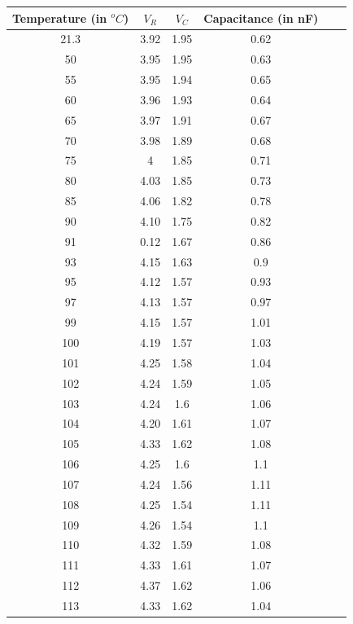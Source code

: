 \documentclass[a4paper]{article}
\begin{document}
\begin{table}[htb]
    \centering
    \begin{tabular}{@{}cccccc@{}}
        \toprule
        Temperature (in $^oC$) & $V_R$ & $V_C$ & Capacitance (in nF) &  &  \\
        \midrule
        21.3 & 3.92 & 1.95 & 0.62 &  &  \\
        50 & 3.95 & 1.95 & 0.63 &  &  \\
        55 & 3.95 & 1.94 & 0.65 &  &  \\
        60 & 3.96 & 1.93 & 0.64 &  &  \\
        65 & 3.97 & 1.91 & 0.67 &  &  \\
        70 & 3.98 & 1.89 & 0.68 &  &  \\
        75 & 4 & 1.85 & 0.71 &  &  \\
        80 & 4.03 & 1.85 & 0.73 &  &  \\
        85 & 4.06 & 1.82 & 0.78 &  &  \\
        90 & 4.10 & 1.75 & 0.82 &  &  \\
        91 & 0.12 & 1.67 & 0.86 &  &  \\
        93 & 4.15 & 1.63 & 0.9 &  &  \\
        95 & 4.12 & 1.57 & 0.93 &  &  \\
        97 & 4.13 & 1.57 & 0.97 &  &  \\
        99 & 4.15 & 1.57 & 1.01 &  &  \\
        100 & 4.19 & 1.57 & 1.03 &  &  \\
        101 & 4.25 & 1.58 & 1.04 &  &  \\
        102 & 4.24 & 1.59 & 1.05 &  &  \\
        103 & 4.24 & 1.6 & 1.06 &  &  \\
        104 & 4.20 & 1.61 & 1.07 &  &  \\
        105 & 4.33 & 1.62 & 1.08 &  &  \\
        106 & 4.25 & 1.6 & 1.1 &  &  \\
        107 & 4.24 & 1.56 & 1.11 &  &  \\
        108 & 4.25 & 1.54 & 1.11 &  &  \\
        109 & 4.26 & 1.54 & 1.1 &  &  \\
        110 & 4.32 & 1.59 & 1.08 &  &  \\
        111 & 4.33 & 1.61 & 1.07 &  &  \\
        112 & 4.37 & 1.62 & 1.06 &  &  \\
        113 & 4.33 & 1.62 & 1.04 &  &  \\

\end{tabular}
\end{table}
\end{document}
